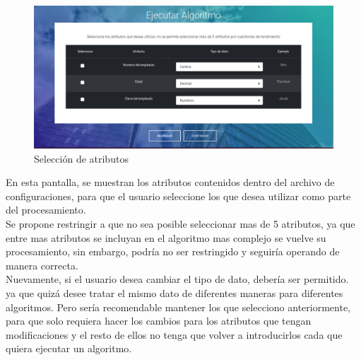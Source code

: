 \begin{figure}[H]
	\hypertarget{fig:red}{\hspace{1pt}}
	\begin{center}
		\includegraphics[width=.9\textwidth]{capitulo7/images/ejecutar2.png}
		\caption{Selección de atributos}
		\label{fig:seleccioneatr}
	\end{center}
\end{figure}
En esta pantalla, se muestran los atributos contenidos dentro del archivo de configuraciones, para que el usuario seleccione los que desea utilizar como parte del procesamiento. \\
Se propone restringir a que no sea posible seleccionar mas de 5 atributos, ya que entre mas atributos se incluyan en el algoritmo mas complejo se vuelve su procesamiento, sin embargo, podría no ser restringido y seguiría operando de manera correcta.\\
Nuevamente, si el usuario desea cambiar el tipo de dato, debería ser permitido. ya que quizá desee tratar el mismo dato de diferentes maneras para diferentes algoritmos. Pero sería recomendable mantener los que selecciono anteriormente, para que solo requiera hacer los cambios para los atributos que tengan modificaciones y el resto de ellos no tenga que volver a introducirlos cada que quiera ejecutar un algoritmo.\\

